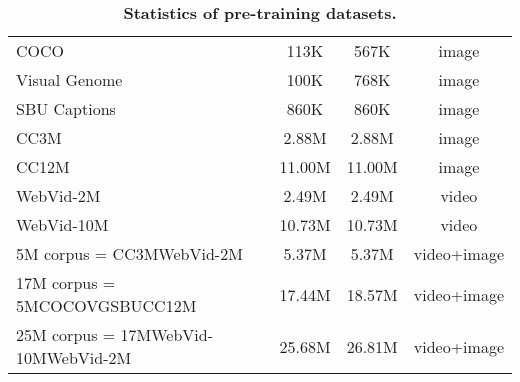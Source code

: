 \documentclass[10pt,twocolumn,letterpaper]{article}
\begin{document}
\begin{table*}[tp]
{\begin{tabular}{lccc}
        COCO \cite{lin2014microsoft} & 113K & 567K & image \\
        Visual Genome \cite{krishna2017visual} & 100K & 768K & image \\
        SBU Captions \cite{ordonez2011im2text} & 860K & 860K & image \\
        CC3M \cite{sharma2018conceptual} & 2.88M & 2.88M & image \\
        CC12M \cite{changpinyo2021conceptual} & 11.00M & 11.00M & image \\
        WebVid-2M \cite{bain2021frozen} & 2.49M & 2.49M & video \\
        WebVid-10M \cite{bain2021frozen} & 10.73M & 10.73M & video \\
        \midrule
        5M corpus = CC3MWebVid-2M & 5.37M & 5.37M & video+image \\
        17M corpus = 5MCOCOVGSBUCC12M & 17.44M & 18.57M & video+image \\
        25M corpus = 17MWebVid-10MWebVid-2M & 25.68M & 26.81M & video+image \\
        \bottomrule
        \end{tabular}
    }
    \vspace{-0.3cm}
    \caption{\textbf{Statistics of pre-training datasets.}
    }
    \label{tab:statics_pretrain}
    \vspace{-0.1cm}
\end{table*}
\end{document}
